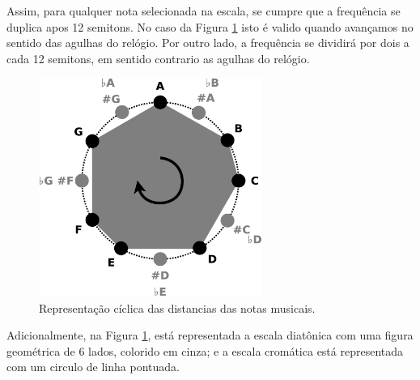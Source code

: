Assim, para qualquer nota selecionada na escala, 
se cumpre que a frequência se duplica apos 12 semitons.
No caso da Figura \ref{fig:circulonotas} isto é valido quando avançamos no sentido das agulhas do relógio.
Por outro lado, a frequência se dividirá por dois a cada 12 semitons,
em sentido contrario as agulhas do relógio.
    \begin{figure}[h]
        \centering
        \includegraphics[width=0.65\textwidth]{chapters/cap-musica-basica/circulonotas.eps}
        \caption{Representação cíclica das distancias das notas musicais.}
        \label{fig:circulonotas}
    \end{figure}

Adicionalmente, na Figura \ref{fig:circulonotas}, 
está representada a escala diatônica com uma figura geométrica de 6 lados, 
colorido em cinza; e a escala cromática está representada com um circulo de linha pontuada.


